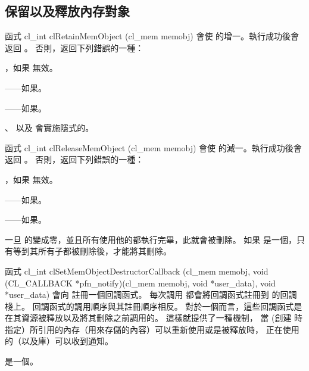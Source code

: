 \subsection{保留以及釋放內存對象}

函式
\startclc
cl_int clRetainMemObject (cl_mem memobj)
\stopclc
會使  的增一。執行成功後會返回 。
否則，返回下列錯誤的一種：
\startigBase
\item {}，如果  無效。

\item {}——如果\scdevfailres。

\item {}——如果\schostfailres。
\stopigBase

、  以及  會實施隱式的。

函式
\startclc
cl_int clReleaseMemObject (cl_mem memobj)
\stopclc
會使  的減一。執行成功後會返回 。
否則，返回下列錯誤的一種：
\startigBase
\item {}，如果  無效。

\item {}——如果\scdevfailres。

\item {}——如果\schostfailres。
\stopigBase

一旦  的變成零，並且所有使用他的都執行完畢，此就會被刪除。
如果  是一個，只有等到其所有子都被刪除後，才能將其刪除。

函式
\startclc
cl_int clSetMemObjectDestructorCallback (cl_mem memobj,
		void (CL_CALLBACK *pfn_notify)(cl_mem memobj,
			void *user_data),
		void *user_data)
\stopclc
會向  註冊一個回調函式。
每次調用  都會將回調函式註冊到  的回調棧上。
回調函式的調用順序與其註冊順序相反。
對於一個而言，這些回調函式是在其資源被釋放以及將其刪除之前調用的。
這樣就提供了一種機制，
當  (創建  時指定）所引用的內存（用來存儲的內容）可以重新使用或是被釋放時，
正在使用  的（以及庫）可以收到通知。

 是一個。

